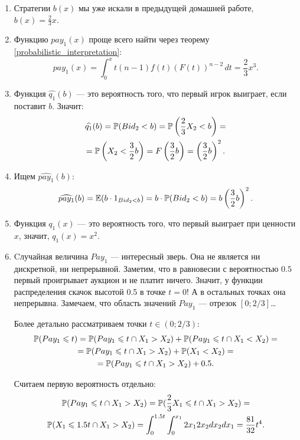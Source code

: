 \begin{enumerate}
\begin{enumerate}
\item Стратегии $ b(x) $ мы уже искали в предыдущей домашней работе, $ b(x)=\frac{2}{3}x $.
\item Функцию $ pay_{1}(x) $ проще всего найти через теорему \ref{probabilistic_interpretation}:
\begin{equation}
pay_{1}(x)=\int_{0}^{x}t(n-1)f(t)(F(t))^{n-2} \, dt=\frac{2}{3}x^{3}.
\end{equation}
\item Функция $ \widehat{q_{1}}(b) $ — это вероятность того, что первый игрок выиграет, если поставит $ b $. Значит:
\begin{multline}
\widehat{q_{1}}(b)=\P(Bid_{2}<b)=\P\left(\frac{2}{3}X_{2}<b\right)=\\
=\P\left( X_{2}<\frac{3}{2}b\right)=F\left(\frac{3}{2}b\right)=\left(\frac{3}{2}b\right)^{2}.
\end{multline}
\item Ищем $ \widehat{pay_{1}}(b) $:
\begin{equation}
\widehat{pay_{1}}(b)=\E(b\cdot 1_{Bid_{2}<b})=b\cdot \P(Bid_{2}<b)=b\left(\frac{3}{2}b\right)^{2}.
\end{equation}
\item Функция $ q_{1}(x) $ — это вероятность того, что первый выиграет при ценности $ x $, значит, $ q_{1}(x)=x^{2} $.
\item Cлучайная величина $ Pay_{1} $ — интересный зверь. Она не является ни дискретной, ни непрерывной. Заметим, что в равновесии с вероятностью $ 0.5 $ первый проигрывает аукцион и не платит ничего. Значит, у функции распределения скачок высотой 0.5 в точке $ t=0 $! А в остальных точках она непрерывна. Замечаем, что область значений $ Pay_{1} $ — отрезок $ [0;2/3] $\ldots

Более детально рассматриваем точки $ t\in (0;2/3) $:
\begin{multline}
\P(Pay_{1}\leq t)=\P(Pay_{1}\leq t \cap X_{1}>X_{2})+\P(Pay_{1}\leq t \cap X_{1}<X_{2})=\\
=\P(Pay_{1}\leq t \cap X_{1}>X_{2})+\P(X_{1}<X_{2})=\\
=\P(Pay_{1}\leq t \cap X_{1}>X_{2})+0.5.
\end{multline}

Считаем первую вероятность отдельно:
\begin{multline}
\P(Pay_{1}\leq t \cap X_{1}>X_{2})=\P(\frac{2}{3}X_{1}\leq t \cap X_{1}>X_{2})=\\
\P(X_{1}\leq 1.5t \cap X_{1}>X_{2})=\int_{0}^{1.5t}\int_{0}^{x_{1}} 2x_{1}2x_{2}dx_{2}dx_{1}=\frac{81}{32}t^{4}.
\end{multline}


\end{enumerate}
\end{enumerate}
